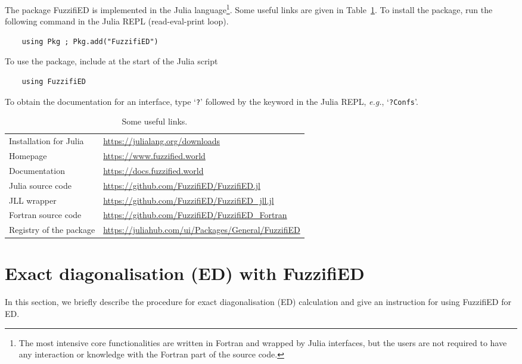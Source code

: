 \documentclass{timesjhep}
\begin{document}
The package FuzzifiED is implemented in the Julia language\footnote{The most intensive core functionalities are written in Fortran and wrapped by Julia interfaces, but the users are not required to have any interaction or knowledge with the Fortran part of the source code.}. Some useful links are given in Table~\ref{tbl:link}. To install the package, run the following command in the Julia REPL (read-eval-print loop). 
\begin{lstlisting}
    using Pkg ; Pkg.add("FuzzifiED")
\end{lstlisting}
To use the package, include at the start of the Julia script
\begin{lstlisting}
    using FuzzifiED
\end{lstlisting}
To obtain the documentation for an interface, type `\lstinline|?|' followed by the keyword in the Julia REPL, \textit{e.g.}, `\lstinline|?Confs|'.

\begin{table}[htbp]
    \centering
    \begin{tabular}{l|l}
        \hline\hline
        Installation for Julia&\url{https://julialang.org/downloads}\\
        Homepage&\url{https://www.fuzzified.world}\\
        Documentation&\url{https://docs.fuzzified.world}\\
        Julia source code&\url{https://github.com/FuzzifiED/FuzzifiED.jl}\\
        JLL wrapper&\url{https://github.com/FuzzifiED/FuzzifiED_jll.jl}\\
        Fortran source code&\url{https://github.com/FuzzifiED/FuzzifiED_Fortran}\\
        Registry of the package&\url{https://juliahub.com/ui/Packages/General/FuzzifiED}\\
        \hline\hline
    \end{tabular}
    \caption{Some useful links.}
    \label{tbl:link}
\end{table}

\section{Exact diagonalisation (ED) with FuzzifiED}
\label{sec:ed}

In this section, we briefly describe the procedure for exact diagonalisation (ED) calculation and give an instruction for using FuzzifiED for ED. 
\end{document}
